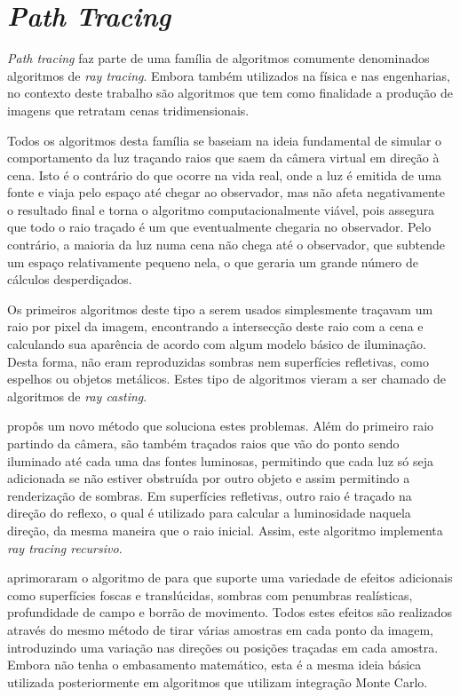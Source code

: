 \documentclass[tg]{mdtufsm}
\begin{document}
\section{\emph{Path Tracing}}

\emph{Path tracing} faz parte de uma família de algoritmos comumente denominados algoritmos de
\emph{ray tracing}. Embora também utilizados na física e nas engenharias, no contexto deste trabalho
são algoritmos que tem como finalidade a produção de imagens que retratam cenas tridimensionais.

Todos os algoritmos desta família se baseiam na ideia fundamental de simular o comportamento da luz
traçando raios que saem da câmera virtual em direção à cena. Isto é o contrário do que ocorre na
vida real, onde a luz é emitida de uma fonte e viaja pelo espaço até chegar ao observador, mas não
afeta negativamente o resultado final e torna o algoritmo computacionalmente viável, pois assegura
que todo o raio traçado é um que eventualmente chegaria no observador. Pelo contrário, a maioria da luz numa cena
não chega até o observador, que subtende um espaço relativamente pequeno nela, o que geraria um grande número de cálculos desperdiçados. \citep{pharr2010}

Os primeiros algoritmos deste tipo a serem usados simplesmente traçavam um raio por pixel da imagem,
encontrando a intersecção deste raio com a cena e calculando sua aparência de acordo com algum
modelo básico de iluminação. Desta forma, não eram reproduzidas sombras nem superfícies refletivas,
como espelhos ou objetos metálicos. Estes tipo de algoritmos vieram a ser chamado de algoritmos de
\emph{ray casting}.

 propôs um novo método que soluciona estes problemas. Além do primeiro raio
partindo da câmera, são também traçados raios que vão do ponto sendo iluminado até cada uma das
fontes luminosas, permitindo que cada luz só seja adicionada se não estiver obstruída por outro
objeto e assim permitindo a renderização de sombras. Em superfícies refletivas, outro raio é traçado
na direção do reflexo, o qual é utilizado para calcular a luminosidade naquela direção, da mesma
maneira que o raio inicial. Assim, este algoritmo implementa \emph{ray tracing recursivo}.

 aprimoraram o algoritmo de \citeauthor{whitted1980} para que suporte uma variedade
de efeitos adicionais como superfícies foscas e translúcidas, sombras com penumbras realísticas,
profundidade de campo e borrão de movimento. Todos estes efeitos são realizados através do mesmo
método de tirar várias amostras em cada ponto da imagem, introduzindo uma variação nas direções ou
posições traçadas em cada amostra. Embora não tenha o embasamento matemático, esta é a mesma ideia
básica utilizada posteriormente em algoritmos que utilizam integração Monte Carlo.
\end{document}
